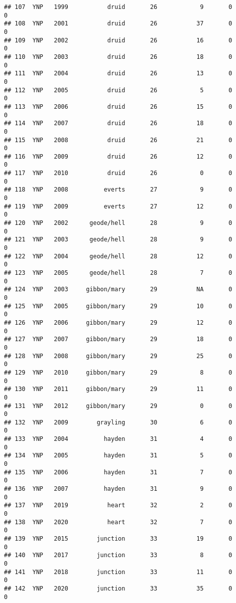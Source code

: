 \documentclass[
]{article}
\begin{document}
\begin{verbatim}
## 107  YNP   1999           druid       26            9       0        0
## 108  YNP   2001           druid       26           37       0        0
## 109  YNP   2002           druid       26           16       0        0
## 110  YNP   2003           druid       26           18       0        0
## 111  YNP   2004           druid       26           13       0        0
## 112  YNP   2005           druid       26            5       0        0
## 113  YNP   2006           druid       26           15       0        0
## 114  YNP   2007           druid       26           18       0        0
## 115  YNP   2008           druid       26           21       0        0
## 116  YNP   2009           druid       26           12       0        0
## 117  YNP   2010           druid       26            0       0        0
## 118  YNP   2008          everts       27            9       0        0
## 119  YNP   2009          everts       27           12       0        0
## 120  YNP   2002      geode/hell       28            9       0        0
## 121  YNP   2003      geode/hell       28            9       0        0
## 122  YNP   2004      geode/hell       28           12       0        0
## 123  YNP   2005      geode/hell       28            7       0        0
## 124  YNP   2003     gibbon/mary       29           NA       0        0
## 125  YNP   2005     gibbon/mary       29           10       0        0
## 126  YNP   2006     gibbon/mary       29           12       0        0
## 127  YNP   2007     gibbon/mary       29           18       0        0
## 128  YNP   2008     gibbon/mary       29           25       0        0
## 129  YNP   2010     gibbon/mary       29            8       0        0
## 130  YNP   2011     gibbon/mary       29           11       0        0
## 131  YNP   2012     gibbon/mary       29            0       0        0
## 132  YNP   2009        grayling       30            6       0        0
## 133  YNP   2004          hayden       31            4       0        0
## 134  YNP   2005          hayden       31            5       0        0
## 135  YNP   2006          hayden       31            7       0        0
## 136  YNP   2007          hayden       31            9       0        0
## 137  YNP   2019           heart       32            2       0        0
## 138  YNP   2020           heart       32            7       0        0
## 139  YNP   2015        junction       33           19       0        0
## 140  YNP   2017        junction       33            8       0        0
## 141  YNP   2018        junction       33           11       0        0
## 142  YNP   2020        junction       33           35       0        0

\end{verbatim}
\end{document}
